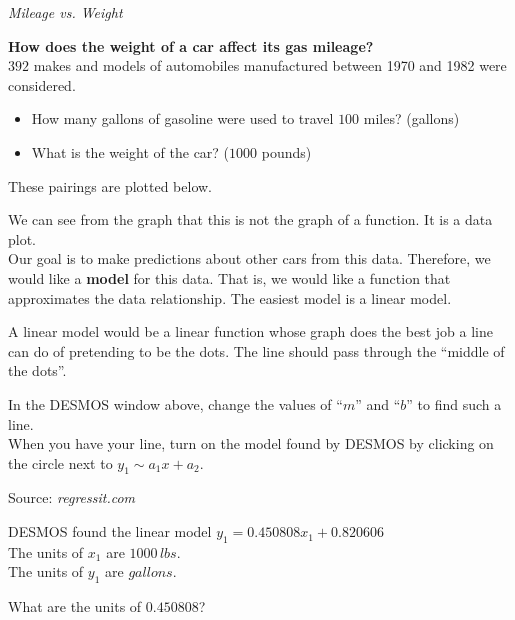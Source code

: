 \documentclass{ximera}
\begin{document}
\begin{model} \textit{Mileage vs. Weight}

\textbf{How does the weight of a car affect its gas mileage?} \\



$392$ makes and models of automobiles manufactured between 1970 and 1982 were considered.  

\begin{itemize}
\item How many gallons of gasoline were used to travel $100$ miles?   (gallons)
\item What is the weight of the car?    ($1000$ pounds)
\end{itemize}


These pairings are plotted below.




\begin{center}
\end{center}


We can see from the graph that this is not the graph of a function.  It is a data plot.\\


Our goal is to make predictions about other cars from this data.  Therefore, we would like a \textbf{\textcolor{purple!85!blue}{model}} for this data.  That is, we would like a function that approximates the data relationship.  The easiest model is a linear model.


A linear model would be a linear function whose graph does the best job a line can do of pretending to be the dots.  The line should pass through the ``middle of the dots''.

In the DESMOS window above, change the values of ``$m$'' and ``$b$'' to find such a line. \\

When you have your line, turn on the model found by DESMOS by clicking on the circle next to $y_1 \sim a_1 x + a_2$.


Source:   \textit{regressit.com}
\end{model}



\begin{question}


DESMOS found the linear model $y_1 = 0.450808 x_1 + 0.820606$ \\


The units of $x_1$ are $1000 \, lbs$. \\
The units of $y_1$ are $gallons$.



What are the units of $0.450808$?

\begin{multipleChoice}
\end{multipleChoice}


\end{question}
\end{document}

